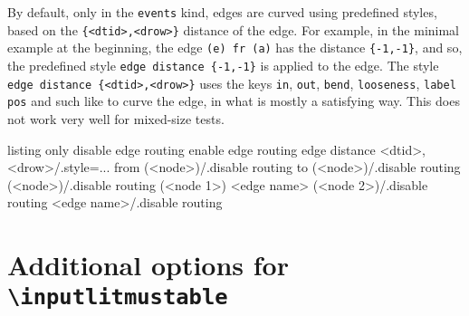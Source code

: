\documentclass[a4paper]{article}
\begin{document}
By default, only in the \lstinline|events| kind, edges are curved using predefined
styles, based on the \lstinline|{<dtid>,<drow>}| distance of the edge.
For example, in the minimal example at the beginning, the edge
\lstinline|(e) fr (a)| has the distance \lstinline|{-1,-1}|, and so, the predefined
style \lstinline|edge distance {-1,-1}| is applied to the edge.
The style \lstinline|edge distance {<dtid>,<drow>}| uses the keys \lstinline|in|,
\lstinline|out|, \lstinline|bend|, \lstinline|looseness|, \lstinline|label pos| and such like
to curve the edge, in what is mostly a satisfying way.
This does not work very well for mixed-size tests.

\begin{tcblisting}{listing only}
disable edge routing
enable edge routing
edge distance {<dtid>,<drow>}/.style={...}
from (<node>)/.disable routing                     %
to (<node>)/.disable routing                       %
(<node>)/.disable routing                          %
(<node 1>) <edge name> (<node 2>)/.disable routing %
<edge name>/.disable routing                       %
\end{tcblisting}



\section{Additional options for \texttt{\textbackslash inputlitmustable}}
\end{document}
